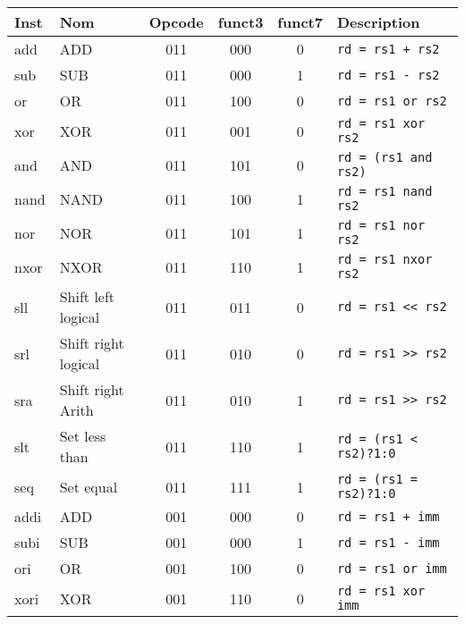 \documentclass[a4paper]{article}
\begin{document}
    \begin{tabular}{|l|l|c|c|c|l|}
        \hline
        Inst  & Nom                  & Opcode & funct3 & funct7 & Description                   \\
        \hline
        add   & ADD                  & 011    & 000    & 0      & \texttt{rd = rs1 + rs2}       \\
        sub   & SUB                  & 011    & 000    & 1      & \texttt{rd = rs1 - rs2}       \\
        or    & OR                   & 011    & 100    & 0      & \texttt{rd = rs1 or rs2}      \\
        xor   & XOR                  & 011    & 001    & 0      & \texttt{rd = rs1 xor rs2}     \\
        and   & AND                  & 011    & 101    & 0      & \texttt{rd = (rs1 and rs2)}   \\
        nand  & NAND                 & 011    & 100    & 1      & \texttt{rd = rs1 nand rs2}    \\
        nor   & NOR                  & 011    & 101    & 1      & \texttt{rd = rs1 nor rs2}     \\
        nxor  & NXOR                 & 011    & 110    & 1      & \texttt{rd = rs1 nxor rs2}    \\
        sll   & Shift left logical   & 011    & 011    & 0      & \texttt{rd = rs1 << rs2}      \\
        srl   & Shift right logical  & 011    & 010    & 0      & \texttt{rd = rs1 >> rs2}      \\
        sra   & Shift right Arith    & 011    & 010    & 1      & \texttt{rd = rs1 >> rs2}      \\
        slt   & Set less than        & 011    & 110    & 1      & \texttt{rd = (rs1 < rs2)?1:0} \\
        seq   & Set equal            & 011    & 111    & 1      & \texttt{rd = (rs1 = rs2)?1:0} \\
        \hline
        addi  & ADD                  & 001    & 000    & 0      & \texttt{rd = rs1 + imm}       \\
        subi  & SUB                  & 001    & 000    & 1      & \texttt{rd = rs1 - imm}       \\
        ori   & OR                   & 001    & 100    & 0      & \texttt{rd = rs1 or imm}      \\
        xori  & XOR                  & 001    & 110    & 0      & \texttt{rd = rs1 xor imm}     \\

\end{tabular}
\end{document}
